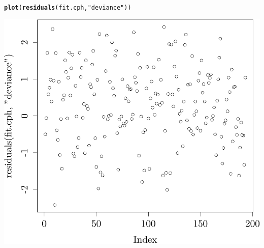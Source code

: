 \documentclass{article}\usepackage[]{graphicx}\usepackage[]{color}
\makeatletter
\def\maxwidth{ %
  \ifdim\Gin@nat@width>\linewidth
    \linewidth
  \else
    \Gin@nat@width
  \fi
}
\newcommand{\hlstr}[1]{\textcolor[rgb]{0.192,0.494,0.8}{#1}}%
\newcommand{\hlstd}[1]{\textcolor[rgb]{0.345,0.345,0.345}{#1}}%
\newcommand{\hlkwd}[1]{\textcolor[rgb]{0.737,0.353,0.396}{\textbf{#1}}}%
\newenvironment{kframe}{%
 \def\at@end@of@kframe{}%
 \ifinner\ifhmode%
  \def\at@end@of@kframe{\end{minipage}}%
  \begin{minipage}{\columnwidth}%
 \fi\fi%
 \def\FrameCommand##1{\hskip\@totalleftmargin \hskip-\fboxsep
 \colorbox{shadecolor}{##1}\hskip-\fboxsep
     \hskip-\linewidth \hskip-\@totalleftmargin \hskip\columnwidth}%
 \MakeFramed {\advance\hsize-\width
   \@totalleftmargin\z@ \linewidth\hsize
   \@setminipage}}%
 {\par\unskip\endMakeFramed%
 \at@end@of@kframe}
\newenvironment{knitrout}{}{} %
\makeatother
\begin{document}
\begin{knitrout}
\color{fgcolor}\begin{kframe}
\begin{alltt}
\hlkwd{plot}\hlstd{(}\hlkwd{residuals}\hlstd{(fit.cph,} \hlstr{"deviance"}\hlstd{))}
\end{alltt}
\end{kframe}

{\centering \includegraphics[width=\maxwidth]{figure/05-final-cph-resids-1} 

}



\end{knitrout}
\end{document}
